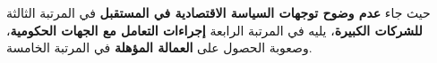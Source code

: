 حيث جاء \textbf{عدم وضوح توجهات السياسة الاقتصادية في المستقبل} في المرتبة الثالثة \textbf{للشركات الكبيرة}، يليه في المرتبة الرابعة \textbf{إجراءات التعامل مع الجهات الحكومية}، وصعوبة الحصول على \textbf{العمالة المؤهلة} في المرتبة الخامسة.

